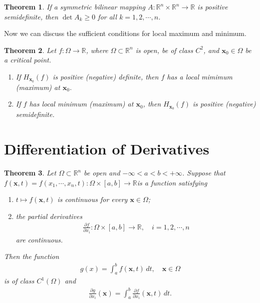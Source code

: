 \documentclass[11pt]{book}
\newtheorem{theorem}{Theorem}[chapter]
\theoremstyle{definition}
\numberwithin{equation}{chapter}
\begin{document}
\medskip

\begin{theorem}
If a symmetric bilinear mapping $A: \mathbb{R}^n \times \mathbb{R}^n \to \mathbb{R}$ is positive semidefinite, then $\det A_k \geq 0$ for all $k = 1,2,\cdots,n$.
\end{theorem}

\medskip

Now we can discuss the sufficient conditions for local maximum and minimum.

\medskip

\begin{theorem}
Let $f: \Omega \to \mathbb{R}$, where $\Omega \subset \mathbb{R}^n$ is open, be of class $C^2$, and $\mathbf{x}_0 \in \Omega$ be a critical point.
\begin{enumerate}[label=(\alph*)]
    \item If $H_{\mathbf{x}_0}(f)$ is positive (negative) definite, then $f$ has a local mimimum (maximum) at $\mathbf{x}_0$.
    
    \item If $f$ has local minimum (maximum) at $\mathbf{x}_0$, then $H_{\mathbf{x}_0}(f)$ is positive (negative) semidefinite.
\end{enumerate}
\end{theorem}

\medskip

\section{Differentiation of Derivatives}

\begin{theorem}\label{th_724}
Let $\Omega \subset \mathbb{R}^n$ be open and $-\infty < a < b < +\infty$. Suppose that $f(\mathbf{x},t) = f(x_1,\cdots,x_n,t): \Omega \times [a,b] \to \mathbb{R}$is a function satisfying
\begin{enumerate}[label=(\alph*)]
    \item $t \mapsto f(\mathbf{x},t)$ is continuous for every $\mathbf{x} \in \Omega$;
    
    \item the partial derivatives
    \begin{align*}
        \frac{\partial f}{\partial x_i}: \Omega \times [a,b] \to \mathbb{R}, \quad i = 1,2,\cdots,n
    \end{align*}
    are continuous.
\end{enumerate}
Then the function
\begin{align*}
    g(x) = \int^b_a f(\mathbf{x},t) \,dt, \quad \mathbf{x} \in \Omega
\end{align*}
is of class $C^1(\Omega)$ and 
\begin{align}\label{th_724_equ1}
    \frac{\partial g}{\partial x_i}(\mathbf{x}) = \int^b_a \frac{\partial f}{\partial x_i}(\mathbf{x},t) \,dt.
\end{align}
\end{theorem}
\end{document}
